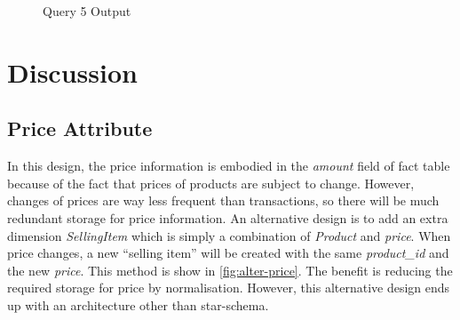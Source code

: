 \documentclass[
  a4paper,
]{article}
\begin{document}
\begin{figure}
    \centering
    \caption{Query 5 Output\label{fig:q5-output}}
\end{figure}

\renewcommand*{\thesubsection}{\oldsubsection}

\hypertarget{discussion}{%
\section{Discussion}\label{discussion}}

\hypertarget{price-attribute}{%
\subsection{Price Attribute}\label{price-attribute}}

In this design, the price information is embodied in the \emph{amount}
field of fact table because of the fact that prices of products are
subject to change. However, changes of prices are way less frequent than
transactions, so there will be much redundant storage for price
information. An alternative design is to add an extra dimension
\emph{SellingItem} which is simply a combination of \emph{Product} and
\emph{price}. When price changes, a new ``selling item'' will be created
with the same \emph{product\_id} and the new \emph{price}. This method
is show in \cref{fig:alter-price}. The benefit is reducing the required
storage for price by normalisation. However, this alternative design
ends up with an architecture other than star-schema.
\end{document}

